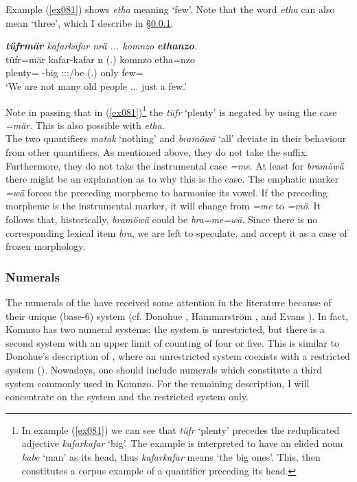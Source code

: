 Example (\ref{ex081}) shows \emph{etha} meaning `few'. Note that the word \emph{etha} can also mean `three', which I describe in \S{}\ref{numerals}.

\begin{exe}
	\ex \emph{\textbf{tüfrmär} kafarkafar nrä ... komnzo \textbf{ethanzo}.}\\
	\gll tüfr=mär kafar-kafar n (.) komnzo etha=nzo\\
	plenty=\Priv{} \Redup{}-big \Fpl:\Sbj:\Nonpast:\Ipfv/be (.) only few=\Only{}\\
	\trans `We are not many old people ... just a few.'
	\label{ex081}
\end{exe}

Note in passing that in (\ref{ex081})\footnote{\label{foot1}In example (\ref{ex081}) we can see that \emph{tüfr} `plenty' precedes the reduplicated adjective \emph{kafarkafar} `big'. The example is interpreted to have an elided noun \emph{kabe} `man' as its head, thus \emph{kafarkafar} means `the big ones'. This, then constitutes a corpus example of a quantifier preceding its head.} the  \emph{tüfr} `plenty' is negated by using the  case \emph{=mär}. This is also possible with \emph{etha}.\\

The two quantifiers \emph{matak} `nothing' and \emph{bramöwä} `all' deviate in their behaviour from other quantifiers. As mentioned above, they do not take the  suffix. Furthermore, they do not take the instrumental case \emph{=me}. At least for \emph{bramöwä} there might be an explanation as to why this is the case. The emphatic marker \emph{=wä} forces the preceding morpheme to harmonise its vowel. If the preceding morpheme is the instrumental marker, it will change from \emph{=me} to \emph{=mö}. It follows that, historically, \emph{bramöwä} could be \emph{bra=me=wä}. Since there is no corresponding lexical item \emph{bra}, we are left to speculate, and accept it as a case of frozen morphology.

\subsubsection{Numerals} \label{numerals}

The numerals of the  have received some attention in the literature because of their unique  (base-6) system (cf. Donohue \citeyear{Donohue:2008bn}, Hammarström \citeyear{Hammarstrom:2009bp}, and Evans \citeyear{Evans:2009wg}). In fact, Komnzo has two numeral systems: the  system is unrestricted, but there is a second system with an upper limit of counting of four or five. This is similar to Donohue's description of , where an unrestricted system coexists with a restricted system (\citealt{Donohue:2008bn}). Nowadays, one should include  numerals which constitute a third system commonly used in Komnzo. For the remaining description, I will concentrate on the  system and the restricted system only.\\

